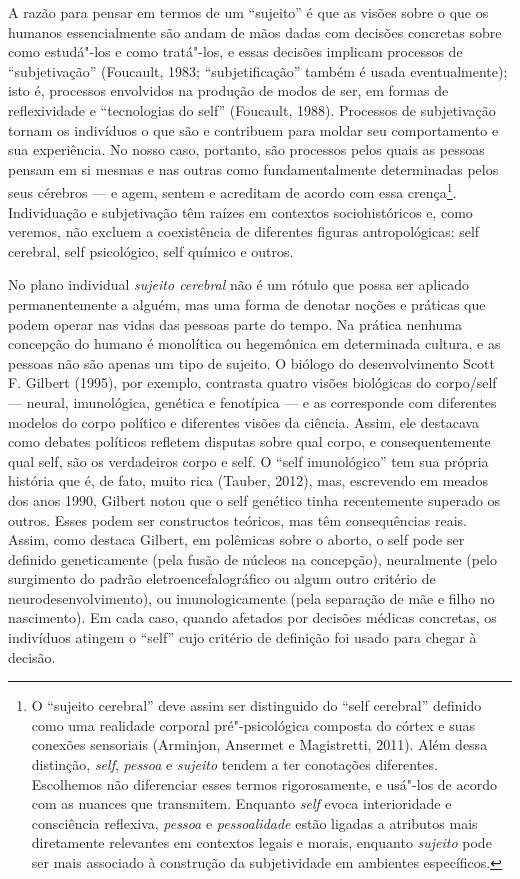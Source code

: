 A razão para pensar em termos de um ``sujeito'' é que as visões sobre o
que os humanos essencialmente são andam de mãos dadas com decisões
concretas sobre como estudá"-los e como tratá"-los, e essas decisões
implicam processos de ``subjetivação'' (Foucault, 1983;
``subjetificação'' também é usada eventualmente); isto é, processos
envolvidos na produção de modos de ser, em formas de reflexividade e
``tecnologias do self'' (Foucault, 1988). Processos de subjetivação
tornam os indivíduos o que são e contribuem para moldar seu
comportamento e sua experiência. No nosso caso, portanto, são processos
pelos quais as pessoas pensam em si mesmas e nas outras como
fundamentalmente determinadas pelos seus cérebros --- e agem, sentem e
acreditam de acordo com essa crença\footnote[4]{O ``sujeito cerebral'' deve assim ser distinguido do ``self
cerebral'' definido como uma realidade corporal pré"-psicológica composta
do córtex e suas conexões sensoriais (Arminjon, Ansermet e Magistretti,
2011). Além dessa distinção, \emph{self}, \emph{pessoa} e \emph{sujeito}
tendem a ter conotações diferentes. Escolhemos não diferenciar esses
termos rigorosamente, e usá"-los de acordo com as nuances que transmitem.
Enquanto \emph{self} evoca interioridade e consciência reflexiva,
\emph{pessoa} e \emph{pessoalidade} estão ligadas a atributos mais
diretamente relevantes em contextos legais e morais, enquanto
\emph{sujeito} pode ser mais associado à construção da subjetividade em
ambientes específicos.}. Individuação e
subjetivação têm raízes em contextos sociohistóricos e, como veremos,
não excluem a coexistência de diferentes figuras antropológicas: self
cerebral, self psicológico, self químico e outros.

No plano individual \emph{sujeito cerebral} não é um rótulo que possa
ser aplicado permanentemente a alguém, mas uma forma de denotar noções e
práticas que podem operar nas vidas das pessoas parte do tempo. Na
prática nenhuma concepção do humano é monolítica ou hegemônica em
determinada cultura, e as pessoas não são apenas um tipo de sujeito. O
biólogo do desenvolvimento Scott F. Gilbert (1995), por exemplo,
contrasta quatro visões biológicas do corpo/self --- neural,
imunológica, genética e fenotípica --- e as corresponde com diferentes
modelos do corpo político e diferentes visões da ciência. Assim, ele
destacava como debates políticos refletem disputas sobre qual corpo, e
consequentemente qual self, são os verdadeiros corpo e self. O ``self
imunológico'' tem sua própria história que é, de fato, muito rica
(Tauber, 2012), mas, escrevendo em meados dos anos 1990, Gilbert notou
que o self genético tinha recentemente superado os outros. Esses podem
ser constructos teóricos, mas têm consequências reais. Assim, como
destaca Gilbert, em polêmicas sobre o aborto, o self pode ser definido
geneticamente (pela fusão de núcleos na concepção), neuralmente (pelo
surgimento do padrão eletroencefalográfico ou algum outro critério de
neurodesenvolvimento), ou imunologicamente (pela separação de mãe e
filho no nascimento). Em cada caso, quando afetados por decisões médicas
concretas, os indivíduos atingem o ``self'' cujo critério de definição
foi usado para chegar à decisão.

